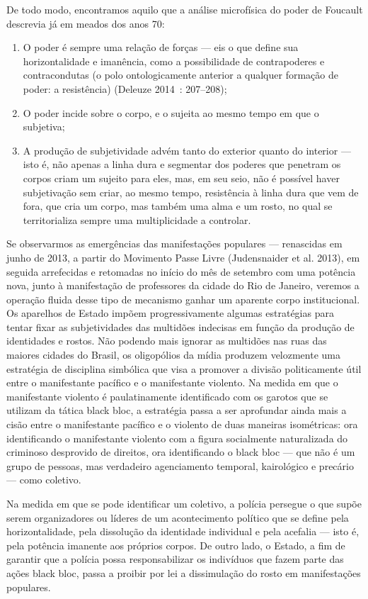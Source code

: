 De todo modo, encontramos aquilo que a análise microfísica do poder de
Foucault descrevia já em meados dos anos 70:

\begin{enumerate}
\item O poder é sempre uma
relação de forças --- eis o que define sua horizontalidade e imanência,
como a possibilidade de contrapoderes e contracondutas (o polo
ontologicamente anterior a qualquer formação de poder: a resistência)
(Deleuze 2014~: 207--208);
\item O poder incide sobre o corpo, e o sujeita
ao mesmo tempo em que o subjetiva;
\item A produção de subjetividade advém
tanto do exterior quanto do interior --- isto é, não apenas a linha dura
e segmentar dos poderes que penetram os corpos criam um sujeito para
eles, mas, em seu seio, não é possível haver subjetivação sem criar, ao
mesmo tempo, resistência à linha dura que vem de fora, que cria um
corpo, mas também uma alma e um rosto, no qual se territorializa sempre
uma multiplicidade a controlar.
\end{enumerate}

Se observarmos as emergências das manifestações populares --- renascidas
em junho de 2013, a partir do Movimento Passe Livre (Judensnaider et
al. 2013), em seguida arrefecidas e retomadas no início do mês de
setembro com uma potência nova, junto à manifestação de professores da
cidade do Rio de Janeiro, veremos a operação fluida desse tipo de
mecanismo ganhar um aparente corpo institucional. Os aparelhos de Estado
impõem progressivamente algumas estratégias para tentar fixar as
subjetividades das multidões indecisas em função da produção de
identidades e rostos. Não podendo mais ignorar as multidões nas ruas das
maiores cidades do Brasil, os oligopólios da mídia produzem velozmente
uma estratégia de disciplina simbólica que visa a promover a divisão
politicamente útil entre o manifestante pacífico e o manifestante
violento. Na medida em que o manifestante violento é paulatinamente
identificado com os garotos que se utilizam da tática black bloc, a
estratégia passa a ser aprofundar ainda mais a cisão entre o
manifestante pacífico e o violento de duas maneiras isométricas: ora
identificando o manifestante violento com a figura socialmente
naturalizada do criminoso desprovido de direitos, ora identificando o
black bloc --- que não é um grupo de pessoas, mas verdadeiro agenciamento
temporal, kairológico e precário --- como coletivo.

Na medida em que se pode identificar um coletivo, a polícia persegue o
que supõe serem organizadores ou líderes de um acontecimento político
que se define pela horizontalidade, pela dissolução da identidade
individual e pela acefalia --- isto é, pela potência imanente aos
próprios corpos. De outro lado, o Estado, a fim de garantir que a
polícia possa responsabilizar os indivíduos que fazem parte das ações
black bloc, passa a proibir por lei a dissimulação do rosto em
manifestações populares.

